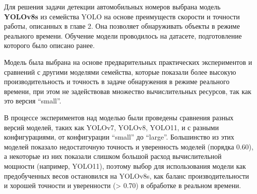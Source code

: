 \documentclass[a4paper,12pt]{article}
\begin{document}
Для решения задачи детекции автомобильных номеров выбрана модель \textbf{YOLOv8s} из семейства YOLO на основе преимуществ скорости и точности работы, описанных в главе 2. Она позволяет обнаруживать объекты в режиме реального времени. Обучение модели проводилось на датасете, подготовление которого было описано ранее.

Модель была выбрана на основе предварительных практических экспериментов и сравнений с другими моделями семейства, которые показали более высокую производительность и точность в задаче обнаружения в режиме реального времени, при этом не задействовав множество вычислительных ресурсов, так как это версия ``small''.

В процессе экспериментов над моделью были проведены сравнения разных версий моделей, таких как YOLOv7, YOLOv8, YOLO11, и с разными конфигурациями, от конфигурации ``small'' до ``large''. Большинство из этих моделей показало недостаточную точность и уверенность моделей (порядка 0.60), а некоторые из них показали слишком большой расход вычислительной мощности (например, YOLO11), поэтому выбор для использования модели как предобученных весов остановился на YOLOv8s, как баланс производительности и хорошей точности и уверенности (> 0.70) в обработке в реальном времени.
\end{document}
